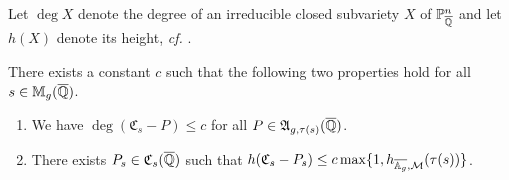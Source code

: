Let $\deg X$ denote the degree of an irreducible closed subvariety $X$ of
${\mathbb{P}}^n_{\overline{\mathbb{Q}}}$ and let $h(X)$ denote its height, \textit{cf.} \cite{BGS}.

\begin{lemma}
  \label{lem:uniformdegreebound}
  There exists a constant $c$ such that the following two properties
  hold for all $s\in \mathbb{M}_g({\overline{\mathbb{Q}}})$.
  \begin{enumerate}
  \item [(i)] We have
    $\deg(\mathfrak{C}_s-P) \le c$
    for all $P\in
    \mathfrak{A}_{g,\tau(s)}({\overline{\mathbb{Q}}})$.
  \item[(ii)]
    There exists $P_s\in \mathfrak{C}_s({\overline{\mathbb{Q}}})$ such that
    $h(\mathfrak{C}_s-P_s) \le  c \max\{1,
    h_{\overline{\mathbb{A}_g},{\mathcal M}}(\tau(s))\}$.    
  \end{enumerate}
\end{lemma}
